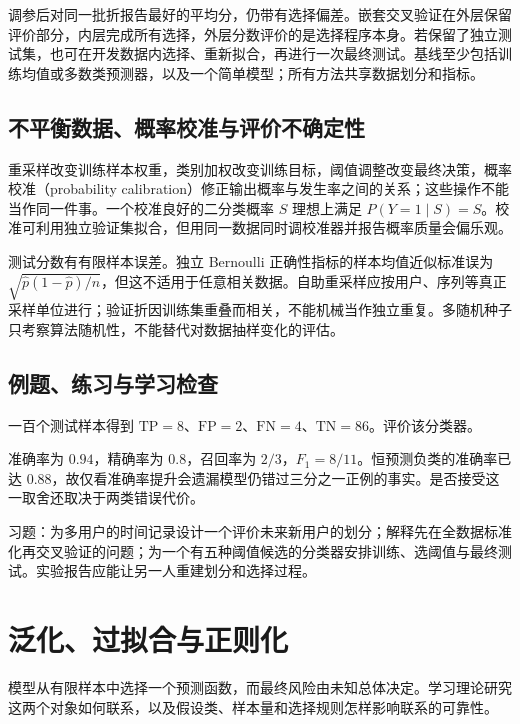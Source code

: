 \documentclass[UTF8,12pt,a4paper,fontset=fandol]{ctexbook}
\begin{document}
调参后对同一批折报告最好的平均分，仍带有选择偏差。嵌套交叉验证在外层保留评价部分，内层完成所有选择，外层分数评价的是选择程序本身。若保留了独立测试集，也可在开发数据内选择、重新拟合，再进行一次最终测试。基线至少包括训练均值或多数类预测器，以及一个简单模型；所有方法共享数据划分和指标。

\section{不平衡数据、概率校准与评价不确定性}

重采样改变训练样本权重，类别加权改变训练目标，阈值调整改变最终决策，概率校准（probability calibration）修正输出概率与发生率之间的关系；这些操作不能当作同一件事。一个校准良好的二分类概率 $S$ 理想上满足 $P(Y=1\mid S)=S$。校准可利用独立验证集拟合，但用同一数据同时调校准器并报告概率质量会偏乐观。

测试分数有有限样本误差。独立 Bernoulli 正确性指标的样本均值近似标准误为 $\sqrt{\widehat p(1-\widehat p)/n}$，但这不适用于任意相关数据。自助重采样应按用户、序列等真正采样单位进行；验证折因训练集重叠而相关，不能机械当作独立重复。多随机种子只考察算法随机性，不能替代对数据抽样变化的评估。

\section{例题、练习与学习检查}

\begin{example}[准确率与召回率]
一百个测试样本得到 $\mathrm{TP}=8$、$\mathrm{FP}=2$、$\mathrm{FN}=4$、$\mathrm{TN}=86$。评价该分类器。
\end{example}
\begin{solve}
准确率为 $0.94$，精确率为 $0.8$，召回率为 $2/3$，$F_1=8/11$。恒预测负类的准确率已达 $0.88$，故仅看准确率提升会遗漏模型仍错过三分之一正例的事实。是否接受这一取舍还取决于两类错误代价。
\end{solve}

习题：为多用户的时间记录设计一个评价未来新用户的划分；解释先在全数据标准化再交叉验证的问题；为一个有五种阈值候选的分类器安排训练、选阈值与最终测试。实验报告应能让另一人重建划分和选择过程。

\chapter{泛化、过拟合与正则化}
\label{chap:ml-generalization}

模型从有限样本中选择一个预测函数，而最终风险由未知总体决定。学习理论研究这两个对象如何联系，以及假设类、样本量和选择规则怎样影响联系的可靠性。
\end{document}
